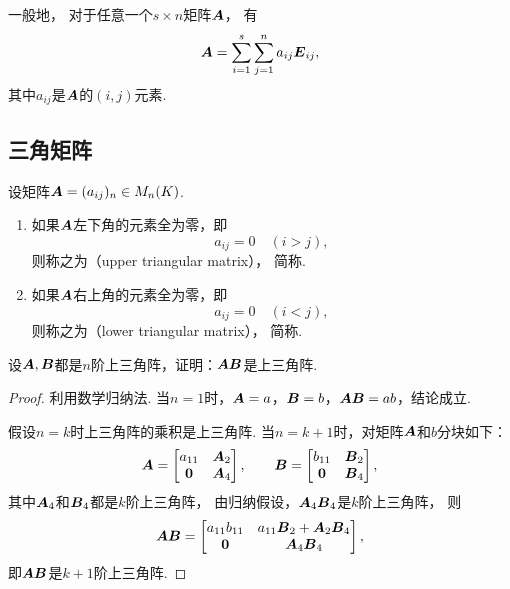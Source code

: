 一般地，
对于任意一个\(s \times n\)矩阵\(\boldsymbol{A}\)，
有\begin{equation*}
	\boldsymbol{A} = \sum_{i=1}^s \sum_{j=1}^n a_{ij} \boldsymbol{E}_{ij},
\end{equation*}
其中\(a_{ij}\)是\(\boldsymbol{A}\)的\((i,j)\)元素.

\subsection{三角矩阵}
\begin{definition}
设矩阵\(\boldsymbol{A}=(a_{ij})_n \in M_n(K)\).
\begin{enumerate}
	\item 如果\(\boldsymbol{A}\)左下角的元素全为零，即\[
		a_{ij} = 0
		\quad(i>j),
	\]
	则称之为（upper triangular matrix），
	简称.

	\item 如果\(\boldsymbol{A}\)右上角的元素全为零，即\[
		a_{ij} = 0
		\quad(i<j),
	\]
	则称之为（lower triangular matrix），
	简称.
\end{enumerate}
\end{definition}

\begin{example}
设\(\boldsymbol{A},\boldsymbol{B}\)都是\(n\)阶上三角阵，证明：\(\boldsymbol{A}\boldsymbol{B}\)是上三角阵.
\begin{proof}
利用数学归纳法.
当\(n=1\)时，\(\boldsymbol{A}=a\)，\(\boldsymbol{B}=b\)，\(\boldsymbol{A}\boldsymbol{B} = ab\)，结论成立.

假设\(n=k\)时上三角阵的乘积是上三角阵.
当\(n=k+1\)时，对矩阵\(\boldsymbol{A}\)和\(b\)分块如下：\[
	\boldsymbol{A} = \begin{bmatrix}
		a_{11} & \boldsymbol{A}_2 \\
		\boldsymbol0 & \boldsymbol{A}_4
	\end{bmatrix},
	\qquad
	\boldsymbol{B} = \begin{bmatrix}
		b_{11} & \boldsymbol{B}_2 \\
		\boldsymbol0 & \boldsymbol{B}_4
	\end{bmatrix},
\]
其中\(\boldsymbol{A}_4\)和\(\boldsymbol{B}_4\)都是\(k\)阶上三角阵，
由归纳假设，\(\boldsymbol{A}_4 \boldsymbol{B}_4\)是\(k\)阶上三角阵，
则\[
	\boldsymbol{A}\boldsymbol{B} = \begin{bmatrix}
		a_{11} b_{11} & a_{11} \boldsymbol{B}_2 + \boldsymbol{A}_2 \boldsymbol{B}_4 \\
		\boldsymbol0 & \boldsymbol{A}_4 \boldsymbol{B}_4
	\end{bmatrix},
\]
即\(\boldsymbol{A}\boldsymbol{B}\)是\(k+1\)阶上三角阵.
\end{proof}
\end{example}


